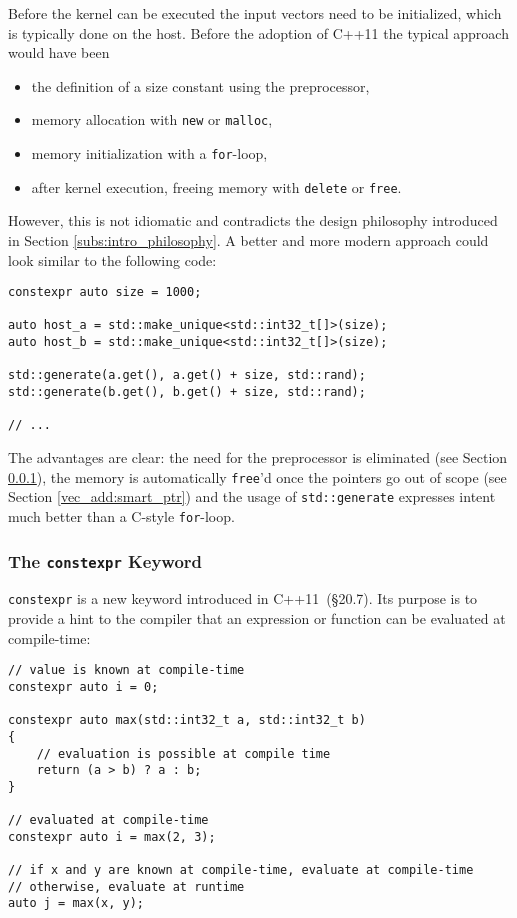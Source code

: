 Before the kernel can be executed the input vectors need to be initialized, which is typically done on the host. Before the adoption of C++11 the typical approach would have been
\begin{itemize}
\item the definition of a size constant using the preprocessor,
\item memory allocation with \texttt{new} or \texttt{malloc},
\item memory initialization with a \texttt{for}-loop,
\item after kernel execution, freeing memory with \texttt{delete} or \texttt{free}.
\end{itemize}

However, this is not idiomatic and contradicts the design philosophy introduced in Section \ref{subs:intro_philosophy}. A better and more modern approach could look similar to the following code:

\begin{lstlisting}
constexpr auto size = 1000;

auto host_a = std::make_unique<std::int32_t[]>(size);
auto host_b = std::make_unique<std::int32_t[]>(size);

std::generate(a.get(), a.get() + size, std::rand);
std::generate(b.get(), b.get() + size, std::rand);

// ...
\end{lstlisting}

The advantages are clear: the need for the preprocessor is eliminated (see Section \ref{vec_add:constexpr}), the memory is automatically \texttt{free}'d once the pointers go out of scope (see Section \ref{vec_add:smart_ptr}) and the usage of \texttt{std::generate} expresses intent much better than a C-style \texttt{for}-loop.

\subsubsection{The \texttt{constexpr} Keyword}\label{vec_add:constexpr}

\texttt{constexpr} is a new keyword introduced in C++11~\cite{cpp11std}(§20.7). Its purpose is to provide a hint to the compiler that an expression or function can be evaluated at compile-time:

\begin{lstlisting}
// value is known at compile-time
constexpr auto i = 0;

constexpr auto max(std::int32_t a, std::int32_t b)
{
    // evaluation is possible at compile time
    return (a > b) ? a : b;
}

// evaluated at compile-time
constexpr auto i = max(2, 3);

// if x and y are known at compile-time, evaluate at compile-time
// otherwise, evaluate at runtime
auto j = max(x, y);
\end{lstlisting}

